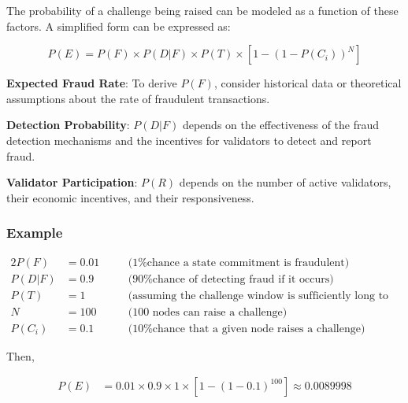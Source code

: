 \documentclass{article}
\begin{document}
\vspace{1em}

The probability of a challenge being raised can be modeled as a function of these factors. A simplified form can be expressed as:

\[
P(E) = P(F) \times P(D|F) \times P(T) \times \left[1 - (1 - P(C_i))^N\right]
\]

\vspace{1em}

\textbf{Expected Fraud Rate}: To derive \( P(F) \), consider historical data or theoretical assumptions about the rate of fraudulent transactions. 

\vspace{1em}

\textbf{Detection Probability}: \( P(D|F) \) depends on the effectiveness of the fraud detection mechanisms and the incentives for validators to detect and report fraud.

\vspace{1em}

\textbf{Validator Participation}: \( P(R) \) depends on the number of active validators, their economic incentives, and their responsiveness.

\subsubsection{Example}

\vspace{1em}

\begin{alignat*}{2}
    P(F) &= 0.01 &\quad &\text{(1\% chance a state commitment is fraudulent)} \\
    P(D|F) &= 0.9 &\quad &\text{(90\% chance of detecting fraud if it occurs)} \\
    P(T) &= 1 &\quad &\text{(assuming the challenge window is sufficiently long to detect fraud)} \\
    N &= 100 &\quad &\text{(100 nodes can raise a challenge)} \\
    P(C_i) &= 0.1 &\quad &\text{(10\% chance that a given node raises a challenge)}
\end{alignat*}

\vspace{1em}

Then,

\begin{align*}
    P(E) &= 0.01 \times 0.9 \times 1 \times \left[1 - (1 - 0.1)^{100}\right] \approx 0.0089998
\end{align*}
\end{document}
